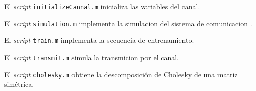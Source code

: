 \documentclass{article}
\begin{document}
\par El \textit{script} \verb+initializeCannal.m+ inicializa las variables del canal.

\begin{ttfamily}
\begin{center}
\end{center}
\end{ttfamily}

\par El \textit{script} \verb+simulation.m+ implementa la simulacion del sistema de comunicacion .

\begin{ttfamily}
\begin{center}
\end{center}
\end{ttfamily}

\par El \textit{script} \verb+train.m+ implementa la secuencia de entrenamiento.

\begin{ttfamily}
\begin{center}
\end{center}
\end{ttfamily}

\par El \textit{script} \verb+transmit.m+ simula la transmicion por el canal.

\begin{ttfamily}
\begin{center}
\end{center}
\end{ttfamily}

\par El \textit{script} \verb+cholesky.m+ obtiene la descomposición de Cholesky de una matriz simétrica.

\begin{ttfamily}
\begin{center}
\end{center}
\end{ttfamily}
\end{document}
